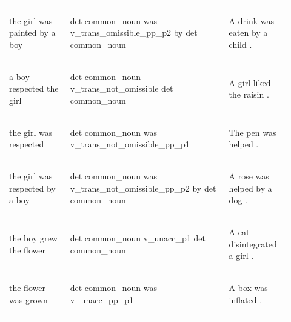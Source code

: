 \documentclass[11pt]{article}
\begin{document}
\begin{table}
\begin{tabular}{p{0.2\linewidth} p{0.52\linewidth} p{0.2\linewidth}}
\begin{small}the girl was painted by a boy\end{small} & \begin{small}det common\_noun was v\_trans\_omissible\_pp\_p2 by det common\_noun \end{small} & \begin{small}A drink was eaten by a child .\end{small} \\
\begin{small}a boy respected the girl\end{small} & \begin{small}det common\_noun v\_trans\_not\_omissible det common\_noun \end{small} & \begin{small}A girl liked the raisin .\end{small} \\
\begin{small}the girl was respected\end{small} & \begin{small}det common\_noun was v\_trans\_not\_omissible\_pp\_p1 \end{small} & \begin{small}The pen was helped .\end{small} \\
\begin{small}the girl was respected by a boy\end{small} & \begin{small}det common\_noun was v\_trans\_not\_omissible\_pp\_p2 by det common\_noun \end{small} & \begin{small}A rose was helped by a dog .\end{small} \\
\begin{small}the boy grew the flower\end{small} & \begin{small}det common\_noun v\_unacc\_p1 det common\_noun \end{small} & \begin{small}A cat disintegrated a girl .\end{small} \\
\begin{small}the flower was grown\end{small} & \begin{small}det common\_noun was v\_unacc\_pp\_p1 \end{small} & \begin{small}A box was inflated .\end{small} \\

\end{tabular}
\end{table}
\end{document}
